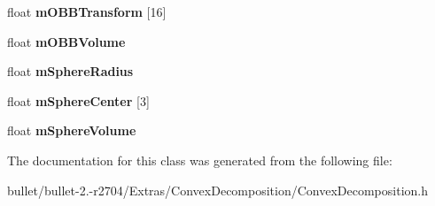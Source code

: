 \begin{DoxyCompactItemize}
\item 
\hypertarget{class_convex_decomposition_1_1_convex_result_ab47652a96740e87a4429fc814b8a8514}{float {\bfseries m\+O\+B\+B\+Transform} \mbox{[}16\mbox{]}}\label{class_convex_decomposition_1_1_convex_result_ab47652a96740e87a4429fc814b8a8514}

\item 
\hypertarget{class_convex_decomposition_1_1_convex_result_a853b2f5ff4672523fd757b087e7d4966}{float {\bfseries m\+O\+B\+B\+Volume}}\label{class_convex_decomposition_1_1_convex_result_a853b2f5ff4672523fd757b087e7d4966}

\item 
\hypertarget{class_convex_decomposition_1_1_convex_result_ab06db274a09247f65760cd634b535445}{float {\bfseries m\+Sphere\+Radius}}\label{class_convex_decomposition_1_1_convex_result_ab06db274a09247f65760cd634b535445}

\item 
\hypertarget{class_convex_decomposition_1_1_convex_result_ac25b672d8760308c3bb7cbadec3551a3}{float {\bfseries m\+Sphere\+Center} \mbox{[}3\mbox{]}}\label{class_convex_decomposition_1_1_convex_result_ac25b672d8760308c3bb7cbadec3551a3}

\item 
\hypertarget{class_convex_decomposition_1_1_convex_result_a04711a2ef01d11c920758058ba491357}{float {\bfseries m\+Sphere\+Volume}}\label{class_convex_decomposition_1_1_convex_result_a04711a2ef01d11c920758058ba491357}

\end{DoxyCompactItemize}


The documentation for this class was generated from the following file\+:\begin{DoxyCompactItemize}
\item 
bullet/bullet-\/2.-\/r2704/\+Extras/\+Convex\+Decomposition/Convex\+Decomposition.\+h\end{DoxyCompactItemize}

